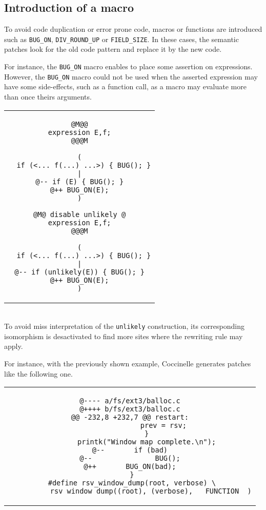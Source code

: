 \newpage
\subsection{Introduction of a macro}

To avoid code duplication or error prone code, macros or functions are
introduced such as \texttt{BUG\_ON}, \texttt{DIV\_ROUND\_UP} or
\texttt{FIELD\_SIZE}. In these cases, the semantic patches look for the
old code pattern and replace it by the new code.

For instance, the \texttt{BUG\_ON} macro enables to place some
assertion on expressions. However, the \texttt{BUG\_ON} macro could
not be used when the asserted expression may have some side-effects,
such as a function call, as a macro may evaluate more than once theirs
arguments.\\

\begin{tabular}{c}
\begin{lstlisting}[language=Cocci,name=bugon]
@M@@
expression E,f;
@@@M

(
  if (<... f(...) ...>) { BUG(); }
|
@-- if (E) { BUG(); }
@++ BUG_ON(E);
)

@M@ disable unlikely @
expression E,f;
@@@M

(
  if (<... f(...) ...>) { BUG(); }
|
@-- if (unlikely(E)) { BUG(); }
@++ BUG_ON(E);
)
\end{lstlisting}\\
\end{tabular}\\

{\color{red} To avoid miss interpretation of the \texttt{unlikely}
  construction, its corresponding isomorphism is desactivated to find
  more sites where the rewriting rule may apply.\\}


For instance, with the previously shown example, Coccinelle generates
patches like the following one.

\begin{tabular}{c}
\begin{lstlisting}[language=PatchC]
@---- a/fs/ext3/balloc.c
@++++ b/fs/ext3/balloc.c
@@ -232,8 +232,7 @@ restart:
                prev = rsv;
        }
        printk("Window map complete.\n");
@--       if (bad)
@--               BUG();
@++       BUG_ON(bad);
 }
 #define rsv_window_dump(root, verbose) \
        __rsv_window_dump((root), (verbose), __FUNCTION__)
\end{lstlisting}
\end{tabular}

